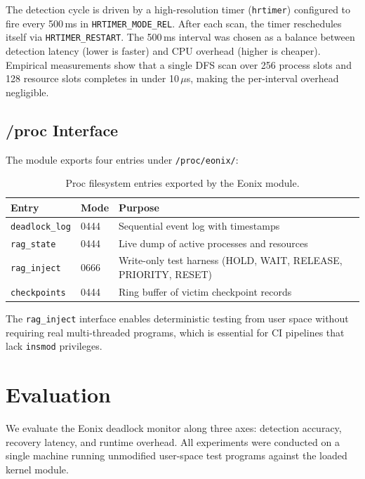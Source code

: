 \documentclass[11pt,letterpaper]{article}
\begin{document}
The detection cycle is driven by a high-resolution timer
(\texttt{hrtimer}) configured to fire every 500\,ms in
\texttt{HRTIMER\_MODE\_REL}.  After each scan, the timer reschedules
itself via \texttt{HRTIMER\_RESTART}.  The 500\,ms interval was chosen
as a balance between detection latency (lower is faster) and CPU
overhead (higher is cheaper).  Empirical measurements show that a single
DFS scan over 256 process slots and 128 resource slots completes in
under 10\,$\mu$s, making the per-interval overhead negligible.

\subsection{/proc Interface}

The module exports four entries under \texttt{/proc/eonix/}:

\begin{table}[h]
\centering
\begin{tabular}{lll}
\toprule
\textbf{Entry} & \textbf{Mode} & \textbf{Purpose} \\
\midrule
\texttt{deadlock\_log} & 0444 & Sequential event log with timestamps \\
\texttt{rag\_state} & 0444 & Live dump of active processes and resources \\
\texttt{rag\_inject} & 0666 & Write-only test harness (HOLD, WAIT, RELEASE, PRIORITY, RESET) \\
\texttt{checkpoints} & 0444 & Ring buffer of victim checkpoint records \\
\bottomrule
\end{tabular}
\caption{Proc filesystem entries exported by the Eonix module.}
\end{table}

The \texttt{rag\_inject} interface enables deterministic testing from
user space without requiring real multi-threaded programs, which is
essential for CI pipelines that lack \texttt{insmod} privileges.

\section{Evaluation}

We evaluate the Eonix deadlock monitor along three axes: detection
accuracy, recovery latency, and runtime overhead.  All experiments were
conducted on a single machine running unmodified user-space test
programs against the loaded kernel module.
\end{document}
